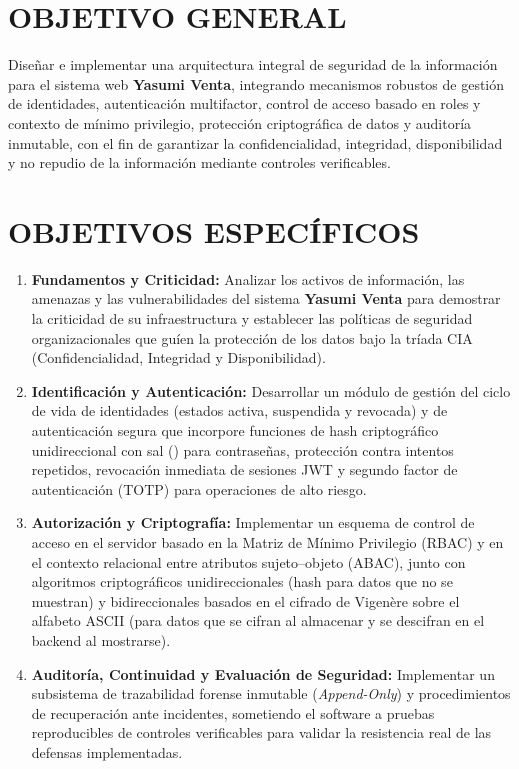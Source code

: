\documentclass[12pt,letterpaper]{article}
\newcommand{\cod}[1]{\path{#1}}
\begin{document}
\section{OBJETIVO GENERAL}

Diseñar e implementar una arquitectura integral de seguridad de la información para el sistema web \textbf{Yasumi Venta}, integrando mecanismos robustos de gestión de identidades, autenticación multifactor, control de acceso basado en roles y contexto de mínimo privilegio, protección criptográfica de datos y auditoría inmutable, con el fin de garantizar la confidencialidad, integridad, disponibilidad y no repudio de la información mediante controles verificables.

\section{OBJETIVOS ESPECÍFICOS}

\begin{enumerate}
  \item \textbf{Fundamentos y Criticidad:} Analizar los activos de información, las amenazas y las vulnerabilidades del sistema \textbf{Yasumi Venta} para demostrar la criticidad de su infraestructura y establecer las políticas de seguridad organizacionales que guíen la protección de los datos bajo la tríada CIA (Confidencialidad, Integridad y Disponibilidad).
  \item \textbf{Identificación y Autenticación:} Desarrollar un módulo de gestión del ciclo de vida de identidades (estados activa, suspendida y revocada) y de autenticación segura que incorpore funciones de hash criptográfico unidireccional con sal (\cod{bcrypt}) para contraseñas, protección contra intentos repetidos, revocación inmediata de sesiones JWT y segundo factor de autenticación (TOTP) para operaciones de alto riesgo.
  \item \textbf{Autorización y Criptografía:} Implementar un esquema de control de acceso en el servidor basado en la Matriz de Mínimo Privilegio (RBAC) y en el contexto relacional entre atributos sujeto--objeto (ABAC), junto con algoritmos criptográficos unidireccionales (hash para datos que no se muestran) y bidireccionales basados en el cifrado de Vigenère sobre el alfabeto ASCII (para datos que se cifran al almacenar y se descifran en el backend al mostrarse).
  \item \textbf{Auditoría, Continuidad y Evaluación de Seguridad:} Implementar un subsistema de trazabilidad forense inmutable (\emph{Append-Only}) y procedimientos de recuperación ante incidentes, sometiendo el software a pruebas reproducibles de controles verificables para validar la resistencia real de las defensas implementadas.
\end{enumerate}
\end{document}
